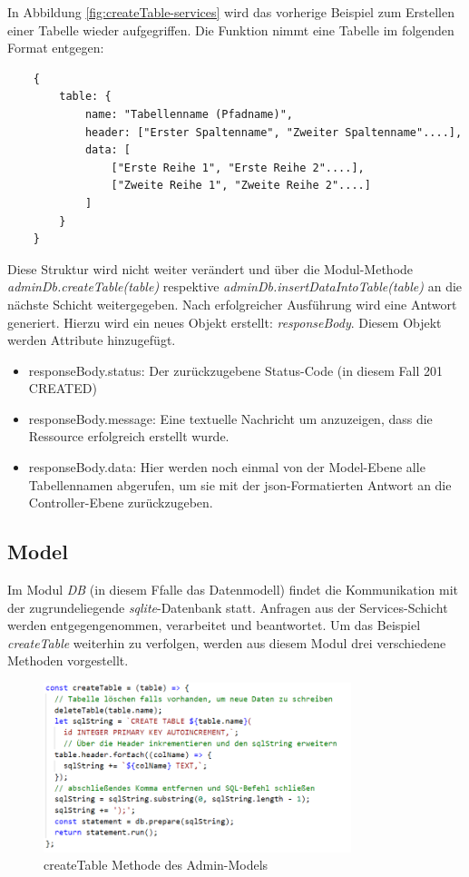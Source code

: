 In Abbildung \ref{fig:createTable-services} wird das vorherige Beispiel zum Erstellen einer Tabelle wieder aufgegriffen. Die Funktion nimmt eine Tabelle im folgenden Format entgegen:

\begin{verbatim}
    {
        table: {
            name: "Tabellenname (Pfadname)",
            header: ["Erster Spaltenname", "Zweiter Spaltenname"....],
            data: [
                ["Erste Reihe 1", "Erste Reihe 2"....],
                ["Zweite Reihe 1", "Zweite Reihe 2"....]
            ]
        }
    }
\end{verbatim}

Diese Struktur wird nicht weiter verändert und über die Modul-Methode \textit{adminDb.createTable(table)} respektive \textit{adminDb.insertDataIntoTable(table)} an die nächste Schicht weitergegeben. Nach erfolgreicher Ausführung wird eine Antwort generiert. Hierzu wird ein neues Objekt erstellt: \textit{responseBody}. Diesem Objekt werden Attribute hinzugefügt.

\begin{itemize}
    \item responseBody.status: Der zurückzugebene Status-Code (in diesem Fall 201 CREATED)
    \item responseBody.message: Eine textuelle Nachricht um anzuzeigen, dass die Ressource erfolgreich erstellt wurde.
    \item responseBody.data: Hier werden noch einmal von der Model-Ebene alle Tabellennamen abgerufen, um sie mit der \gls{json}-Formatierten Antwort an die Controller-Ebene zurückzugeben. 
\end{itemize}

\subsection{Model}
Im Modul \textit{DB} (in diesem Ffalle das Datenmodell) findet die Kommunikation mit der zugrundeliegende \textit{sqlite}-Datenbank statt. Anfragen aus der Services-Schicht werden entgegengenommen, verarbeitet und beantwortet. Um das Beispiel \textit{createTable} weiterhin zu verfolgen, werden aus diesem Modul drei verschiedene Methoden vorgestellt. 

\begin{figure}[h]
    \centering
    \includegraphics[width=0.8\textwidth]{figures/code-model-createTable.png}
    \caption{createTable Methode des Admin-Models}
    \label{fig:createTable-model-createTable}
\end{figure}

